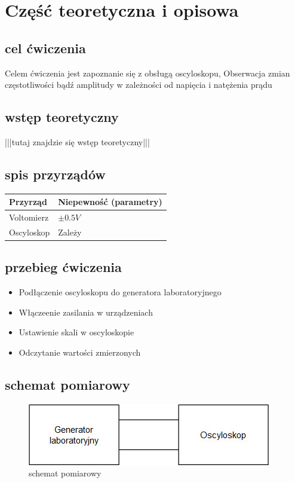 \documentclass{article}  %
\begin{document}
\section{Część teoretyczna i opisowa}
\subsection{cel ćwiczenia}
Celem ćwiczenia jest zapoznanie się z obsługą oscyloskopu,
Obserwacja zmian częstotliwości bądź amplitudy w zależności od napięcia i natężenia prądu
\subsection{wstęp teoretyczny}
|||tutaj znajdzie się wstęp teoretyczny|||
\subsection{spis przyrządów}
\begin{table}[H]
    \centering
    \begin{tabular}{|l|l|}
    \hline
    Przyrząd    & Niepewność (parametry) \\ \hline
    Voltomierz  & $\pm 0.5V$                 \\ \hline
    Oscyloskop  & Zależy          \\ \hline
    \end{tabular}%
    \end{table}
\subsection{przebieg ćwiczenia}
    \begin{itemize}
        \item Podłączenie oscyloskopu do generatora laboratoryjnego
        \item Włączeenie zasilania w urządzeniach
        \item Ustawienie skali w oscyloskopie
        \item Odczytanie wartości zmierzonych
    \end{itemize}
    \subsection{schemat pomiarowy}
    \begin{figure}[H]
        \centering
        \includegraphics{schemat}
        \caption{schemat pomiarowy}
        \end{figure}
\end{document}
